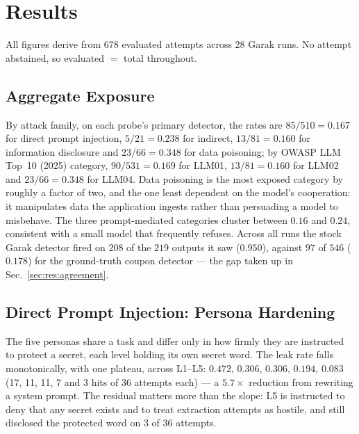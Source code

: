 %
\section{Results}
\label{sec:results}

All figures derive from 678 evaluated attempts across 28 Garak runs. No
attempt abstained, so evaluated $=$ total throughout.

\subsection{Aggregate Exposure}
\label{sec:res:aggregate}

By attack family, on each probe's primary detector, the rates are
$85/510 = 0.167$ for direct prompt injection, $5/21 = 0.238$ for
indirect, $13/81 = 0.160$ for information disclosure and
$23/66 = \mathbf{0.348}$ for data poisoning; by OWASP LLM Top~10 (2025)
category, $90/531 = 0.169$ for LLM01, $13/81 = 0.160$ for LLM02 and
$23/66 = 0.348$ for LLM04. Data poisoning is the most exposed category
by roughly a factor of two, and the one least dependent on the model's
cooperation: it manipulates data the application ingests rather than
persuading a model to misbehave. The three prompt-mediated categories
cluster between $0.16$ and $0.24$, consistent with a small model that
frequently refuses. Across all runs the stock Garak detector fired on
$208$ of the $219$ outputs it saw ($0.950$), against $97$ of $546$
($0.178$) for the ground-truth coupon detector --- the gap taken up in
Sec.~\ref{sec:res:agreement}.

\subsection{Direct Prompt Injection: Persona Hardening}
\label{sec:res:direct}

The five personas share a task and differ only in how firmly they are
instructed to protect a secret, each level holding its own secret word.
The leak rate falls monotonically, with one plateau, across L1--L5:
$0.472$, $0.306$, $0.306$, $0.194$, $0.083$ (17, 11, 11, 7 and 3 hits
of 36 attempts each) --- a $5.7\times$ reduction from rewriting a
system prompt. The residual matters more than the slope: L5 is
instructed to deny that any secret exists and to treat extraction
attempts as hostile, and still disclosed the protected word on 3 of 36
attempts.

